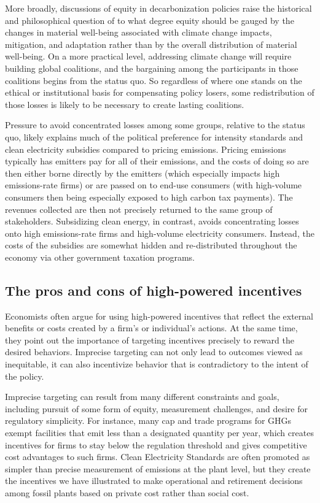 \documentclass[12pt]{article}
\begin{document}
More broadly, discussions of equity in decarbonization policies raise the historical and philosophical question of to what degree equity should be gauged by the changes in material well-being associated with climate change impacts, mitigation, and adaptation rather than by the overall distribution of material well-being. On a more practical level, addressing climate change will require building global coalitions, and the bargaining among the participants in those coalitions begins from the status quo.  So regardless of where one stands on the ethical or institutional basis for compensating policy losers, some redistribution of those losses is likely to be necessary to create lasting coalitions.

Pressure to avoid concentrated losses among some groups, relative to the status quo, likely explains much of the political preference for intensity standards and clean electricity subsidies compared to pricing emissions. Pricing emissions typically has emitters pay for all of their emissions, and the costs of doing so are then either borne directly by the emitters (which especially impacts high emissions-rate firms) or are passed on to end-use consumers (with high-volume consumers then being especially exposed to high carbon tax payments). The revenues collected are then not precisely returned to the same group of stakeholders. Subsidizing clean energy, in contrast, avoids concentrating losses onto high emissions-rate firms and high-volume electricity consumers. Instead, the costs of the subsidies are somewhat hidden and re-distributed throughout the economy via other government taxation programs.


\subsection{The pros and cons of high-powered incentives}

Economists often argue for using high-powered incentives that reflect the external benefits or costs created by a firm's or individual's actions.  At the same time, they point out the importance of targeting incentives precisely to reward the desired behaviors. Imprecise targeting can not only lead to outcomes viewed as inequitable, it can also incentivize behavior that is contradictory to the intent of the policy. 

Imprecise targeting can result from many different constraints and goals, including pursuit of some form of equity, measurement challenges, and desire for regulatory simplicity. For instance, many cap and trade programs for GHGs exempt facilities that emit less than a designated quantity per year, which creates incentives for firms to stay below the regulation threshold and gives competitive cost advantages to such firms. Clean Electricity Standards are often promoted as simpler than precise measurement of emissions at the plant level, but they create the incentives we have illustrated to make operational and retirement decisions among fossil plants based on private cost rather than social cost.
\end{document}
